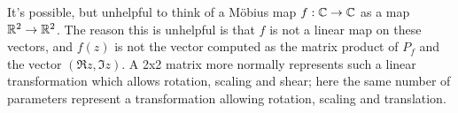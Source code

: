 It's possible, but unhelpful to think of a M\"obius map $f:\mathbb{C}\rightarrow\mathbb{C}$ as a  map $\mathbb{R}^2\rightarrow\mathbb{R}^2$.  The reason this is unhelpful is that $f$ is not a linear map on these vectors, and $f(z)$ is not the vector computed as the matrix product of $P_f$ and the vector $(\Re{z},\Im{z})$. A 2x2 matrix more normally represents such a linear transformation which allows rotation, scaling and shear; here the same number of parameters represent a transformation allowing rotation, scaling and translation. 

